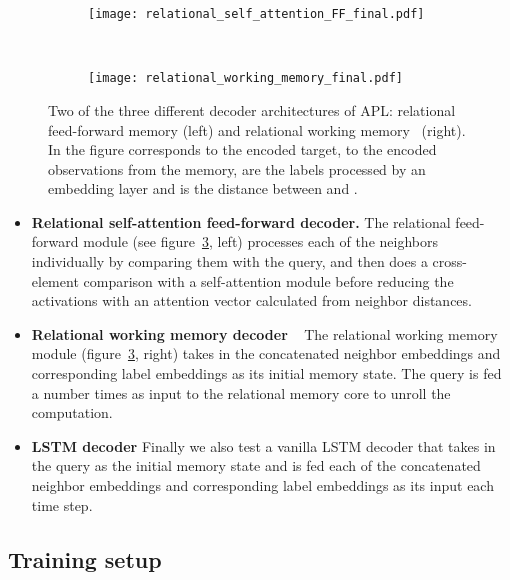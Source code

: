 \documentclass{article} \usepackage{iclr2019_conference,times}
\begin{document}
\begin{figure}
    \centering
    \begin{subfigure}[b]{0.55\textwidth}
        \texttt{[image: relational\_self\_attention\_FF\_final.pdf]}
        \label{fig:rm}
    \end{subfigure}
    ~ \begin{subfigure}[b]{0.40\textwidth}
        \texttt{[image: relational\_working\_memory\_final.pdf]}
        \label{fig:rwm}
    \end{subfigure}
    \caption{Two of the three different decoder architectures of APL: relational feed-forward memory (left) and relational working memory~\citep{santoro2018relational} (right). In the figure  corresponds to the encoded target,  to the encoded observations from the memory,  are the labels processed by an embedding layer and  is the distance between  and .}
    \label{fig:decoders}
\end{figure}

\begin{itemize}
    \item \textbf{Relational self-attention feed-forward decoder.}
    The relational feed-forward module (see figure~\ref{fig:decoders}, left) processes each of the neighbors individually by comparing them with the query, and then does a cross-element comparison with a self-attention module before reducing the activations with an attention vector calculated from neighbor distances.
    
    \item \textbf{Relational working memory decoder}
~\citep{santoro2018relational} The relational working memory module (figure~\ref{fig:decoders}, right) takes in the concatenated neighbor embeddings and corresponding label embeddings as its initial memory state. The query is fed a number  times as input to the relational memory core to unroll the computation.

\item \textbf{LSTM decoder}
Finally we also test a vanilla LSTM decoder that takes in the query as the initial memory state and is fed each of the concatenated neighbor embeddings and corresponding label embeddings  as its input each time step.


\end{itemize}



\subsection{Training setup}
\end{document}
